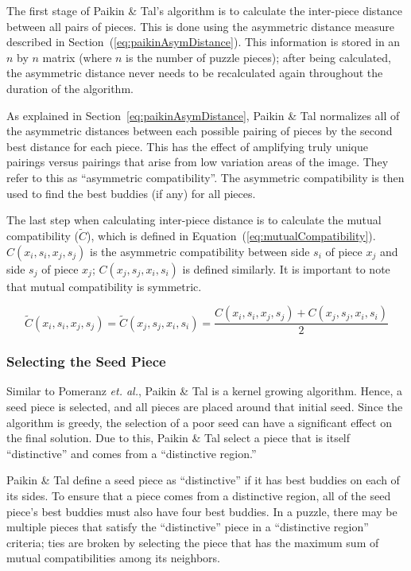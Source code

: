 \documentclass{report}
\def\eref#1{(\ref{#1})}
\begin{document}
The first stage of Paikin \& Tal's algorithm is to calculate the inter-piece distance between all pairs of pieces.  This is done using the asymmetric distance measure described in Section~\eref{eq:paikinAsymDistance}.  This information is stored in an $n$ by $n$ matrix (where $n$ is the number of puzzle pieces); after being calculated, the asymmetric distance never needs to be recalculated again throughout the duration of the algorithm.

As explained in Section~\ref{eq:paikinAsymDistance}, Paikin \& Tal normalizes all of the asymmetric distances between each possible pairing of pieces by the second best distance for each piece.  This has the effect of amplifying truly unique pairings versus pairings that arise from low variation areas of the image.  They refer to this as ``asymmetric compatibility''.  The asymmetric compatibility is then used to find the best buddies (if any) for all pieces.  

The last step when calculating inter-piece distance is to calculate the mutual compatibility ($\tilde{C}$), which is defined in Equation~\eref{eq:mutualCompatibility}.  $C(x_i,s_i,x_j,s_j)$ is the asymmetric compatibility between side $s_i$ of piece $x_j$ and side $s_j$ of piece $x_j$; $C(x_j,s_j,x_i,s_i)$ is defined similarly.  It is important to note that mutual compatibility is symmetric.

\begin{equation} \label{eq:mutualCompatibility}
\tilde{C}(x_i,s_i,x_j,s_j)=\tilde{C}(x_j,s_j,x_i,s_i)=\frac{C(x_i,s_i,x_j,s_j) + C(x_j,s_j,x_i,s_i) }{2}
\end{equation}

\subsubsection{Selecting the Seed Piece}\label{sec:paikinTalSeedPiece}

Similar to Pomeranz \textit{et. al.}, Paikin \& Tal is a kernel growing algorithm.  Hence, a seed piece is selected, and all pieces are placed around that initial seed.    Since the algorithm is greedy, the selection of a poor seed can have a significant effect on the final solution.  Due to this, Paikin \& Tal select a piece that is itself ``distinctive'' and comes from a ``distinctive region.''  

Paikin \& Tal define a seed piece as ``distinctive'' if it has best buddies on each of its sides.  To ensure that a piece comes from a distinctive region, all of the seed piece's best buddies must also have four best buddies. In a puzzle, there may be multiple pieces that satisfy the ``distinctive'' piece in a ``distinctive region'' criteria; ties are broken by selecting the piece that has the maximum sum of mutual compatibilities among its neighbors.
\end{document}
